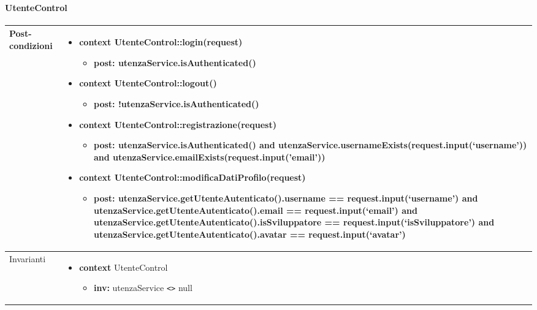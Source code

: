 \paragraph{UtenteControl}
\small\begin{tabular}{|| l | p{28em} ||}
	\hline
	Post-condizioni & \begin{itemize}
		\item \textbf{context} UtenteControl::login(request)
		\begin{itemize}
			\item[ ] \textbf{post:} utenzaService.isAuthenticated()
		\end{itemize}
	  
	    \item \textbf{context} UtenteControl::logout()
		\begin{itemize}
			\item[ ] \textbf{post:} !utenzaService.isAuthenticated()
		\end{itemize} 
	  
	    \item \textbf{context} UtenteControl::registrazione(request) 
		\begin{itemize}
			\item[ ] \textbf{post:} utenzaService.isAuthenticated() and utenzaService.usernameExists(request.input(‘username’)) and utenzaService.emailExists(request.input('email'))
		\end{itemize} 

	    \item \textbf{context} UtenteControl::modificaDatiProfilo(request) 
		\begin{itemize}
			\item[ ] \textbf{post:} utenzaService.getUtenteAutenticato().username == request.input(‘username’) and utenzaService.getUtenteAutenticato().email == request.input(‘email’) and utenzaService.getUtenteAutenticato().isSviluppatore == request.input(‘isSviluppatore’) and utenzaService.getUtenteAutenticato().avatar == request.input(‘avatar’)
		\end{itemize} 
	\end{itemize}\\
	\hline
	Invarianti & \begin{itemize}
		\item \textbf{context} UtenteControl
		\begin{itemize}
			\item[ ] \textbf{inv:} utenzaService \verb|<>| null
		\end{itemize}
	\end{itemize}\\
	\hline
	\end{tabular}

